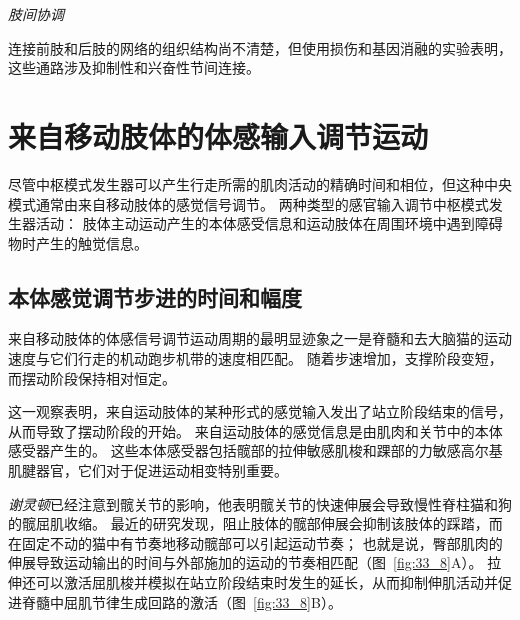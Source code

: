 \textit{肢间协调}

连接前肢和后肢的网络的组织结构尚不清楚，但使用损伤和基因消融的实验表明，这些通路涉及抑制性和兴奋性节间连接。



\section{来自移动肢体的体感输入调节运动}

尽管中枢模式发生器可以产生行走所需的肌肉活动的精确时间和相位，但这种中央模式通常由来自移动肢体的感觉信号调节。
两种类型的感官输入调节中枢模式发生器活动：
肢体主动运动产生的本体感受信息和运动肢体在周围环境中遇到障碍物时产生的触觉信息。



\subsection{本体感觉调节步进的时间和幅度}

来自移动肢体的体感信号调节运动周期的最明显迹象之一是脊髓和去大脑猫的运动速度与它们行走的机动跑步机带的速度相匹配。
随着步速增加，支撑阶段变短，而摆动阶段保持相对恒定。


这一观察表明，来自运动肢体的某种形式的感觉输入发出了站立阶段结束的信号，从而导致了摆动阶段的开始。
来自运动肢体的感觉信息是由肌肉和关节中的本体感受器产生的。
这些本体感受器包括髋部的拉伸敏感肌梭和踝部的力敏感高尔基肌腱器官，它们对于促进运动相变特别重要。


\textit{谢灵顿}已经注意到髋关节的影响，他表明髋关节的快速伸展会导致慢性脊柱猫和狗的髋屈肌收缩。
最近的研究发现，阻止肢体的髋部伸展会抑制该肢体的踩踏，而在固定不动的猫中有节奏地移动髋部可以引起运动节奏；
也就是说，臀部肌肉的伸展导致运动输出的时间与外部施加的运动的节奏相匹配（图~\ref{fig:33_8}A）。
拉伸还可以激活屈肌梭并模拟在站立阶段结束时发生的延长，从而抑制伸肌活动并促进脊髓中屈肌节律生成回路的激活（图~\ref{fig:33_8}B）。


